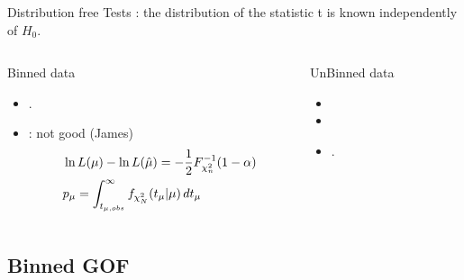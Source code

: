 \documentclass[asd-beamer.tex]{subfiles}%
\begin{document}
\begin{frame}{Distribution free Tests}
: the distribution of the statistic t is known independently of $H_0$.
\begin{columns}[T]
\begin{column}{0.5\textwidth}
\begin{block}{Binned data}
\begin{itemize}
\item {}.
\item {}: not good (James)
\begin{align*}
&\ln{L(\mu)}-\ln{L(\hat{\mu})}=-\frac{1}{2}{F}^{-1}_{\chi_n^2}(1-\alpha)\\
&p_{\mu}=\int_{t_{\mu,obs}}^{\infty}f_{\chi^2_N}(t_{\mu}|\mu)\,dt_{\mu}
\end{align*}
\end{itemize}
\end{block}
\end{column}
\begin{column}{0.5\textwidth}
\begin{block}{UnBinned data}
\begin{itemize}
\item {}
\item {}
\item {}.
\end{itemize}
\end{block}
\end{column}
\end{columns}
\end{frame}

\subsection{Binned GOF}\label{binnedgof}
\end{document}
